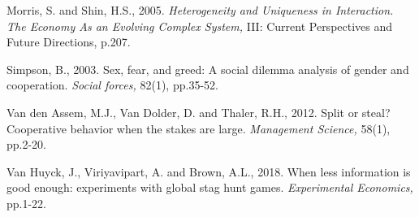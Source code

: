 \documentclass[12pt, letterpaper]{article}
\theoremstyle{plain}
\begin{document}
\begin{thebibliography}{10}



\bibitem{} Morris, S. and Shin, H.S., 2005. \textit{Heterogeneity and Uniqueness in Interaction. The Economy As an Evolving Complex System,} III: Current Perspectives and Future Directions, p.207.






\bibitem{} Simpson, B., 2003. Sex, fear, and greed: A social dilemma analysis of gender and cooperation. \textit{Social forces,} 82(1), pp.35-52.

\bibitem{} Van den Assem, M.J., Van Dolder, D. and Thaler, R.H., 2012. Split or steal? Cooperative behavior when the stakes are large. \textit{Management Science,} 58(1), pp.2-20.


\bibitem{} Van Huyck, J., Viriyavipart, A. and Brown, A.L., 2018. When less information is good enough: experiments with global stag hunt games. \textit{Experimental Economics,} pp.1-22.



\end{thebibliography}
\end{document}
